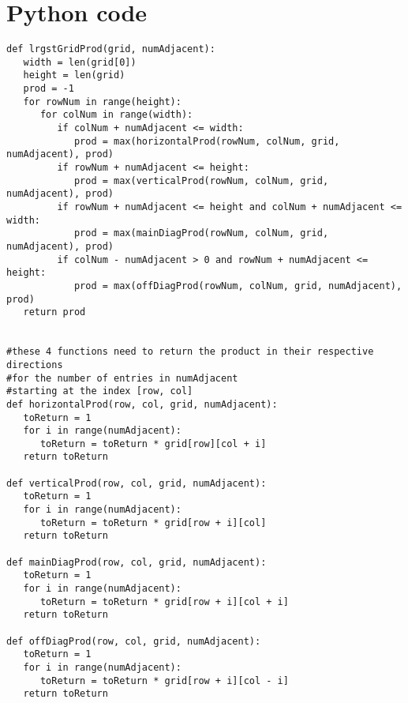 \documentclass{article}
\begin{document}
\section*{Python code}
\begin{verbatim}
def lrgstGridProd(grid, numAdjacent):
   width = len(grid[0])
   height = len(grid)
   prod = -1
   for rowNum in range(height):
      for colNum in range(width):
         if colNum + numAdjacent <= width:
            prod = max(horizontalProd(rowNum, colNum, grid, numAdjacent), prod)
         if rowNum + numAdjacent <= height:
            prod = max(verticalProd(rowNum, colNum, grid, numAdjacent), prod)
         if rowNum + numAdjacent <= height and colNum + numAdjacent <= width:
            prod = max(mainDiagProd(rowNum, colNum, grid, numAdjacent), prod)
         if colNum - numAdjacent > 0 and rowNum + numAdjacent <= height:
            prod = max(offDiagProd(rowNum, colNum, grid, numAdjacent), prod)
   return prod


#these 4 functions need to return the product in their respective directions
#for the number of entries in numAdjacent
#starting at the index [row, col]
def horizontalProd(row, col, grid, numAdjacent):
   toReturn = 1
   for i in range(numAdjacent):
      toReturn = toReturn * grid[row][col + i]
   return toReturn

def verticalProd(row, col, grid, numAdjacent):
   toReturn = 1
   for i in range(numAdjacent):
      toReturn = toReturn * grid[row + i][col]
   return toReturn

def mainDiagProd(row, col, grid, numAdjacent):
   toReturn = 1
   for i in range(numAdjacent):
      toReturn = toReturn * grid[row + i][col + i]
   return toReturn

def offDiagProd(row, col, grid, numAdjacent):
   toReturn = 1
   for i in range(numAdjacent):
      toReturn = toReturn * grid[row + i][col - i]
   return toReturn


\end{verbatim}
\end{document}
